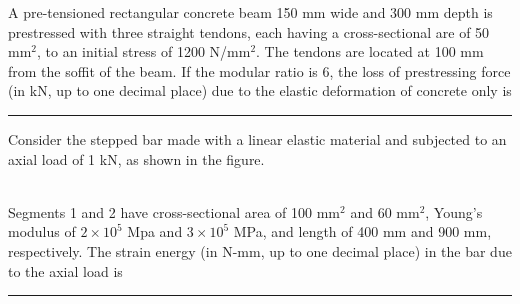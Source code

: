 \item A pre-tensioned rectangular concrete beam 150 mm wide and 300 mm depth is prestressed with three straight tendons, each having a cross-sectional are of 50 mm${^2}$, to an initial stress of 1200 N/mm${^2}$. The tendons are located at 100 mm from the soffit of the beam. If the modular ratio is 6, the loss of prestressing force (in kN, up to one decimal place) due to the elastic deformation of concrete only is \rule{1cm}{0.15mm}

\item Consider the stepped bar made with a linear elastic material and subjected to an axial load of 1 kN, as shown in the figure.\\
\centering
{}\\
Segments 1 and 2 have cross-sectional area of 100 mm$^{2}$ and 60 mm$^2$, Young's modulus of $2 \times 10^5$ Mpa and $3 \times 10^5$ MPa, and length of 400 mm and 900 mm, respectively. The strain energy (in N-mm, up to one decimal place) in the bar due to the axial load is \rule{1cm}{0.15mm}
